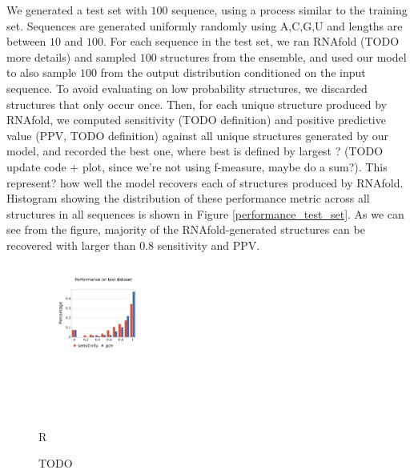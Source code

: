 \documentclass{article}
\begin{document}
We generated a test set with $100$ sequence, using a process similar to the training set.
Sequences are generated uniformly randomly using A,C,G,U and lengths are between $10$ and $100$.
For each sequence in the test set, we ran RNAfold (TODO more details) and sampled $100$ structures from the ensemble,
and used our model to also sample $100$ from the output distribution conditioned on the input sequence.
To avoid evaluating on low probability structures, we discarded structures that only occur once.
Then, for each unique structure produced by RNAfold, we computed sensitivity (TODO definition) and
positive predictive value (PPV, TODO definition) against all unique structures generated by our model,
and recorded the best one, where best is defined by largest ? (TODO update code + plot, since we're not using f-measure, maybe do a sum?).
This represent? how well the model recovers each of structures produced by RNAfold.
Histogram showing the distribution of these performance metric across all structures in all sequences is shown in Figure \ref{performance_test_set}.
As we can see from the figure, majority of the RNAfold-generated structures can be recovered with larger than $0.8$ sensitivity and PPV.

\begin{figure}{R}
    \centering
    \includegraphics[width=0.4\textwidth]{plot/performance_test_set.pdf}
    \caption{TODO}
    \label{fig:performance_test_set}
    \centering
\end{figure}



\end{document}

